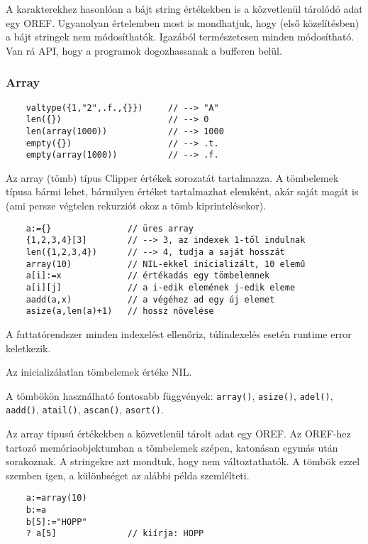 A karakterekhez hasonlóan a bájt string értékekben is a közvetlenül tárolódó 
adat egy OREF. Ugyanolyan értelemben most is mondhatjuk, hogy (első közelítésben)
a bájt stringek nem módosíthatók.  Igazából természetesen minden módosítható.
Van rá API, hogy a programok dogozhassanak a bufferen belül.


\subsubsection{Array}

\begin{verbatim}
    valtype({1,"2",.f.,{}})     // --> "A"
    len({})                     // --> 0
    len(array(1000))            // --> 1000
    empty({})                   // --> .t.
    empty(array(1000))          // --> .f.
\end{verbatim}

Az array (tömb) típus Clipper értékek sorozatát tartalmazza.
A tömbelemek típusa bármi lehet, bármilyen értéket tartalmazhat
elemként, akár saját magát is (ami persze végtelen rekurziót okoz
a tömb kiprintelésekor).

\begin{verbatim}
    a:={}               // üres array
    {1,2,3,4}[3]        // --> 3, az indexek 1-től indulnak
    len({1,2,3,4})      // --> 4, tudja a saját hosszát
    array(10)           // NIL-ekkel inicializált, 10 elemű
    a[i]:=x             // értékadás egy tömbelemnek
    a[i][j]             // a i-edik elemének j-edik eleme
    aadd(a,x)           // a végéhez ad egy új elemet
    asize(a,len(a)+1)   // hossz növelése
\end{verbatim}

A futtatórendszer minden indexelést ellenőriz, 
túlindexelés esetén runtime error keletkezik. 

Az inicializálatlan tömbelemek értéke NIL.

A tömbökön használható fontosabb függvények:
\verb!array()!,
\verb!asize()!,
\verb!adel()!,
\verb!aadd()!,
\verb!atail()!,
\verb!ascan()!,
\verb!asort()!.

Az array típusú értékekben a közvetlenül tárolt adat egy OREF.
Az OREF-hez tartozó memóriaobjektumban a tömbelemek szépen, 
katonásan egymás után sorakoznak.
A stringekre azt mondtuk, hogy nem változtathatók.
A tömbök ezzel szemben igen, a különbséget az alábbi példa
szemlélteti.

\begin{verbatim}
    a:=array(10)
    b:=a
    b[5]:="HOPP"
    ? a[5]              // kiírja: HOPP
\end{verbatim}



